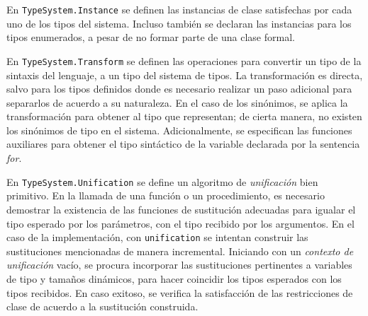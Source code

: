 En \lstinline[style = module]{TypeSystem.Instance} se definen las instancias de clase satisfechas por cada uno de los tipos del sistema.
Incluso también se declaran las instancias para los tipos enumerados, a pesar de no formar parte de una clase formal.

En \lstinline[style = module]{TypeSystem.Transform} se definen las operaciones para convertir un tipo de la sintaxis del lenguaje, a un tipo del sistema de tipos.
La transformación es directa, salvo para los tipos definidos donde es necesario realizar un paso adicional para separarlos de acuerdo a su naturaleza.
En el caso de los sinónimos, se aplica la transformación para obtener al tipo que representan; de cierta manera, no existen los sinónimos de tipo en el sistema.
Adicionalmente, se especifican las funciones auxiliares para obtener el tipo sintáctico de la variable declarada por la sentencia \textit{for}.

En \lstinline[style = module]{TypeSystem.Unification} se define un algoritmo de \textit{unificación} bien primitivo.
En la llamada de una función o un procedimiento, es necesario demostrar la existencia de las funciones de sustitución adecuadas para igualar el tipo esperado por los parámetros, con el tipo recibido por los argumentos.
En el caso de la implementación, con \lstinline[style = haskell]{unification} se intentan construir las sustituciones mencionadas de manera incremental.
Iniciando con un \textit{contexto de unificación} vacío, se procura incorporar las sustituciones pertinentes a variables de tipo y tamaños dinámicos, para hacer coincidir los tipos esperados con los tipos recibidos.
En caso exitoso, se verifica la satisfacción de las restricciones de clase de acuerdo a la sustitución construida.


